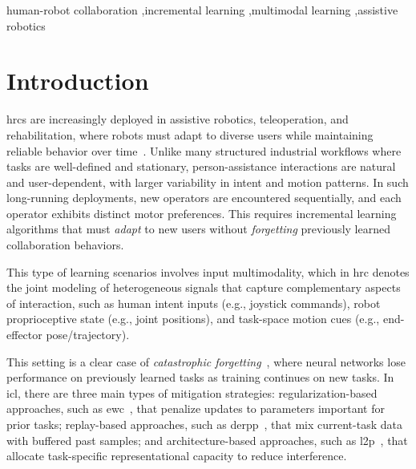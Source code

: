 \documentclass[3p,times,procedia]{elsarticle}
\begin{document}
\begin{frontmatter}
\begin{keyword}
human-robot collaboration \sep incremental learning \sep multimodal learning \sep assistive robotics
\end{keyword}
\end{frontmatter}

\newpage

\section{Introduction}

\acp{hrc} are increasingly deployed in assistive robotics, teleoperation, and rehabilitation, where robots must adapt to diverse users while maintaining reliable behavior over time~\cite{javdani2018shared, reddy2018shared, selvaggio2021autonomy}. Unlike many structured industrial workflows where tasks are well-defined and stationary, person-assistance interactions are natural and user-dependent, with larger variability in intent and motion patterns. In such long-running deployments, new operators are encountered sequentially, and each operator exhibits distinct motor preferences. This requires incremental learning algorithms that must \emph{adapt} to new users without \emph{forgetting} previously learned collaboration behaviors.

This type of learning scenarios involves input multimodality, which in \ac{hrc} denotes the joint modeling of heterogeneous signals that capture complementary aspects of interaction, such as human intent inputs (e.g., joystick commands), robot proprioceptive state (e.g., joint positions), and task-space motion cues (e.g., end-effector pose/trajectory).%

This setting is a clear case of \emph{catastrophic forgetting}~\cite{delange2022continual}, where neural networks lose performance on previously learned tasks as training continues on new tasks. In \ac{icl}, there are three main types of mitigation strategies: regularization-based approaches, such as \ac{ewc}~\cite{kirkpatrick2017overcoming}, that penalize updates to parameters important for prior tasks; replay-based approaches, such as \ac{derpp}~\cite{buzzega2020dark}, that mix current-task data with buffered past samples; and architecture-based approaches, such as \ac{l2p}~\cite{wang2022l2p}, that allocate task-specific representational capacity to reduce interference.
\end{document}
